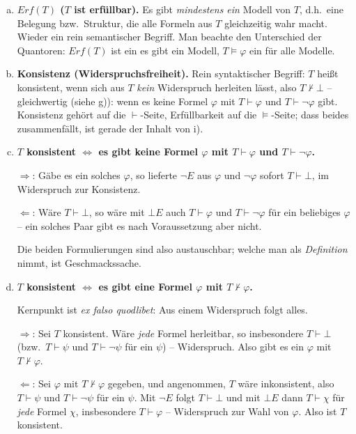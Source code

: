 \begin{loesung}
\begin{enumerate}[a)]
  \item \textbf{$Erf(T)$ (\glqq{}$T$ ist erfüllbar\grqq{}).} Es gibt \emph{mindestens ein} Modell von $T$, d.h.\ eine Belegung bzw.\ Struktur, die alle Formeln aus $T$ gleichzeitig wahr macht. Wieder ein rein semantischer Begriff. Man beachte den Unterschied der Quantoren: $Erf(T)$ ist ein \glqq{}es gibt ein Modell\grqq{}, $T\models\varphi$ ein \glqq{}für alle Modelle\grqq{}.

  \item \textbf{Konsistenz (Widerspruchsfreiheit).} Rein syntaktischer Begriff: $T$ heißt konsistent, wenn sich aus $T$ \emph{kein} Widerspruch herleiten lässt, also $T\nvdash\bot$ -- gleichwertig (siehe g)): wenn es keine Formel $\varphi$ mit $T\vdash\varphi$ und $T\vdash\neg\varphi$ gibt. Konsistenz gehört auf die $\vdash$-Seite, Erfüllbarkeit auf die $\models$-Seite; dass beides zusammenfällt, ist gerade der Inhalt von i).

  \item \textbf{$T$ konsistent $\iff$ es gibt keine Formel $\varphi$ mit $T\vdash\varphi$ und $T\vdash\neg\varphi$.}

  \glqq{}$\Rightarrow$\grqq{}: Gäbe es ein solches $\varphi$, so lieferte $\neg E$ aus $\varphi$ und $\neg\varphi$ sofort $T\vdash\bot$, im Widerspruch zur Konsistenz.

  \glqq{}$\Leftarrow$\grqq{}: Wäre $T\vdash\bot$, so wäre mit $\bot E$ auch $T\vdash\varphi$ und $T\vdash\neg\varphi$ für ein beliebiges $\varphi$ -- ein solches Paar gibt es nach Voraussetzung aber nicht.

  Die beiden Formulierungen sind also austauschbar; welche man als \emph{Definition} nimmt, ist Geschmackssache.

  \item \textbf{$T$ konsistent $\iff$ es gibt eine Formel $\varphi$ mit $T\nvdash\varphi$.}

  Kernpunkt ist \emph{ex falso quodlibet}: Aus einem Widerspruch folgt alles.

  \glqq{}$\Rightarrow$\grqq{}: Sei $T$ konsistent. Wäre \emph{jede} Formel herleitbar, so insbesondere $T\vdash\bot$ (bzw.\ $T\vdash\psi$ und $T\vdash\neg\psi$ für ein $\psi$) -- Widerspruch. Also gibt es ein $\varphi$ mit $T\nvdash\varphi$.

  \glqq{}$\Leftarrow$\grqq{}: Sei $\varphi$ mit $T\nvdash\varphi$ gegeben, und angenommen, $T$ wäre inkonsistent, also $T\vdash\psi$ und $T\vdash\neg\psi$ für ein $\psi$. Mit $\neg E$ folgt $T\vdash\bot$ und mit $\bot E$ dann $T\vdash\chi$ für \emph{jede} Formel $\chi$, insbesondere $T\vdash\varphi$ -- Widerspruch zur Wahl von $\varphi$. Also ist $T$ konsistent.


\end{enumerate}
\end{loesung}
